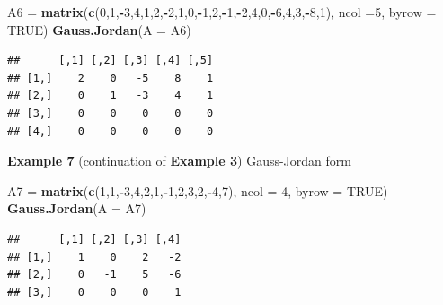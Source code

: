 \documentclass[
]{book}
\newenvironment{Shaded}{\begin{snugshade}}{\end{snugshade}}
\newcommand{\AttributeTok}[1]{\textcolor[rgb]{0.13,0.29,0.53}{#1}}
\newcommand{\ConstantTok}[1]{\textcolor[rgb]{0.56,0.35,0.01}{#1}}
\newcommand{\DecValTok}[1]{\textcolor[rgb]{0.00,0.00,0.81}{#1}}
\newcommand{\FunctionTok}[1]{\textcolor[rgb]{0.13,0.29,0.53}{\textbf{#1}}}
\newcommand{\NormalTok}[1]{#1}
\newcommand{\OtherTok}[1]{\textcolor[rgb]{0.56,0.35,0.01}{#1}}
\newcommand{\SpecialCharTok}[1]{\textcolor[rgb]{0.81,0.36,0.00}{\textbf{#1}}}
\begin{document}
\begin{Shaded}
\begin{Highlighting}[]
\NormalTok{A6 }\OtherTok{=} \FunctionTok{matrix}\NormalTok{(}\FunctionTok{c}\NormalTok{(}\DecValTok{0}\NormalTok{,}\DecValTok{1}\NormalTok{,}\SpecialCharTok{{-}}\DecValTok{3}\NormalTok{,}\DecValTok{4}\NormalTok{,}\DecValTok{1}\NormalTok{,}\DecValTok{2}\NormalTok{,}\SpecialCharTok{{-}}\DecValTok{2}\NormalTok{,}\DecValTok{1}\NormalTok{,}\DecValTok{0}\NormalTok{,}\SpecialCharTok{{-}}\DecValTok{1}\NormalTok{,}\DecValTok{2}\NormalTok{,}\SpecialCharTok{{-}}\DecValTok{1}\NormalTok{,}\SpecialCharTok{{-}}\DecValTok{2}\NormalTok{,}\DecValTok{4}\NormalTok{,}\DecValTok{0}\NormalTok{,}\SpecialCharTok{{-}}\DecValTok{6}\NormalTok{,}\DecValTok{4}\NormalTok{,}\DecValTok{3}\NormalTok{,}\SpecialCharTok{{-}}\DecValTok{8}\NormalTok{,}\DecValTok{1}\NormalTok{), }\AttributeTok{ncol =}\DecValTok{5}\NormalTok{, }\AttributeTok{byrow =} \ConstantTok{TRUE}\NormalTok{)}
\FunctionTok{Gauss.Jordan}\NormalTok{(}\AttributeTok{A =}\NormalTok{ A6)}
\end{Highlighting}
\end{Shaded}

\begin{verbatim}
##      [,1] [,2] [,3] [,4] [,5]
## [1,]    2    0   -5    8    1
## [2,]    0    1   -3    4    1
## [3,]    0    0    0    0    0
## [4,]    0    0    0    0    0
\end{verbatim}

\hfill\break

\textbf{Example 7} (continuation of \textbf{Example 3}) Gauss-Jordan form

\begin{Shaded}
\begin{Highlighting}[]
\NormalTok{A7 }\OtherTok{=} \FunctionTok{matrix}\NormalTok{(}\FunctionTok{c}\NormalTok{(}\DecValTok{1}\NormalTok{,}\DecValTok{1}\NormalTok{,}\SpecialCharTok{{-}}\DecValTok{3}\NormalTok{,}\DecValTok{4}\NormalTok{,}\DecValTok{2}\NormalTok{,}\DecValTok{1}\NormalTok{,}\SpecialCharTok{{-}}\DecValTok{1}\NormalTok{,}\DecValTok{2}\NormalTok{,}\DecValTok{3}\NormalTok{,}\DecValTok{2}\NormalTok{,}\SpecialCharTok{{-}}\DecValTok{4}\NormalTok{,}\DecValTok{7}\NormalTok{), }\AttributeTok{ncol =} \DecValTok{4}\NormalTok{, }\AttributeTok{byrow =} \ConstantTok{TRUE}\NormalTok{)}
\FunctionTok{Gauss.Jordan}\NormalTok{(}\AttributeTok{A =}\NormalTok{ A7)}
\end{Highlighting}
\end{Shaded}

\begin{verbatim}
##      [,1] [,2] [,3] [,4]
## [1,]    1    0    2   -2
## [2,]    0   -1    5   -6
## [3,]    0    0    0    1
\end{verbatim}
\end{document}
